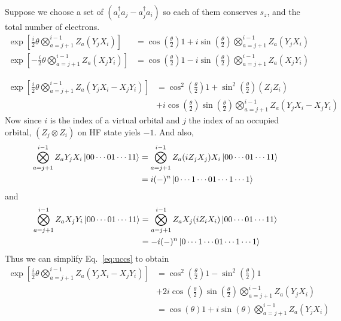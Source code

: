 \documentclass[11pt, oneside]{article}   	%
\begin{document}
Suppose we choose a set of $(a^{\dagger}_i a_j - a^{\dagger}_j a_i)$ so each of them conserves $s_z$, and the total number of electrons.
\begin{align}
\exp \left[ \frac{i}{2} \theta \bigotimes^{i-1}_{a=j+1} Z_a  (Y_j X_i) \right] 
&= \cos \left( \frac{\theta}{2} \right) 1 + i \sin \left( \frac{\theta}{2} \right) \bigotimes^{i-1}_{a=j+1} Z_a  (Y_j X_i) \\
\exp \left[ - \frac{i}{2} \theta \bigotimes^{i-1}_{a=j+1} Z_a  (X_j Y_i) \right]
&= \cos \left( \frac{\theta}{2} \right) 1 - i \sin \left( \frac{\theta}{2} \right) \bigotimes^{i-1}_{a=j+1} Z_a  (X_j Y_i)
\end{align}

\begin{align}
\label{eq:uccs}
\exp \left[ \frac{i}{2} \theta \bigotimes^{i-1}_{a=j+1} Z_a  (Y_j X_i - X_j Y_i) \right] 
&= \cos^2 \left( \frac{\theta}{2} \right) 1 +  \sin^2 \left( \frac{\theta}{2} \right) (Z_j Z_i) \\
&+ i \cos  \left( \frac{\theta}{2} \right) \sin \left( \frac{\theta}{2} \right) \bigotimes^{i-1}_{a=j+1} Z_a  (Y_j X_i - X_j Y_i) 
\end{align}
Now since $i$ is the index of a virtual orbital and $j$ the index of an occupied orbital, $(Z_j \otimes Z_i)$ on HF state yiels $-1$.
And also,
\begin{align}
\bigotimes^{i-1}_{a=j+1} Z_a Y_j X_i \ket{00\cdots01\cdots11} 
&= \bigotimes^{i-1}_{a=j+1} Z_a (i Z_j X_j) X_i \ket{00\cdots01\cdots11} \\
&= i (-)^{n} \ket{0\cdots 1 \cdots01\cdots1 \cdots 1}
\end{align}
and 
\begin{align}
\bigotimes^{i-1}_{a=j+1} Z_a X_j Y_i \ket{00\cdots01\cdots11} 
&= \bigotimes^{i-1}_{a=j+1} Z_a X_j (i Z_i X_i) \ket{00\cdots01\cdots11} \\
&= - i (-)^{n} \ket{0\cdots 1 \cdots01\cdots1 \cdots 1}
\end{align}
Thus we can simplify Eq.~\ref{eq:uccs} to obtain
\begin{align}
\exp \left[ \frac{i}{2} \theta \bigotimes^{i-1}_{a=j+1} Z_a  (Y_j X_i - X_j Y_i) \right] 
&= \cos^2 \left( \frac{\theta}{2} \right) 1 -  \sin^2 \left( \frac{\theta}{2} \right) 1 \\
&+ 2 i \cos  \left( \frac{\theta}{2} \right) \sin \left( \frac{\theta}{2} \right) \bigotimes^{i-1}_{a=j+1} Z_a  (Y_j X_i) \\
&= \cos (\theta) 1 + i \sin (\theta) \bigotimes^{i-1}_{a=j+1} Z_a  (Y_j X_i) 
\end{align}
\end{document}

